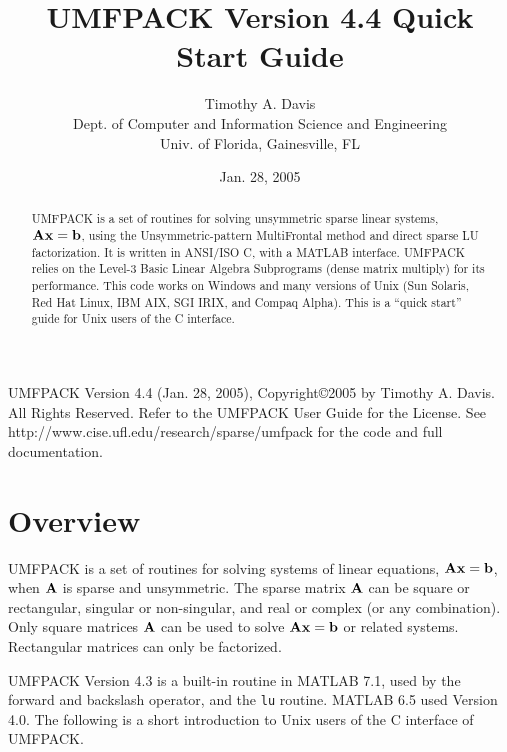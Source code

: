 \documentclass[11pt]{article}
\newcommand{\m}[1]{{\bf{#1}}}       %
\begin{document}
\author{Timothy A. Davis \\
Dept. of Computer and Information Science and Engineering \\
Univ. of Florida, Gainesville, FL}
\title{UMFPACK Version 4.4 Quick Start Guide}
\date{Jan. 28, 2005}
\maketitle

\begin{abstract}
    UMFPACK is a set of routines for solving unsymmetric sparse linear
    systems, $\m{Ax}=\m{b}$, using the Unsymmetric-pattern MultiFrontal method
    and direct sparse LU factorization.  It is written in ANSI/ISO C, with a
    MATLAB interface.  UMFPACK relies on the Level-3
    Basic Linear Algebra Subprograms (dense matrix multiply) for its
    performance.  This code works on Windows and many versions of Unix (Sun
    Solaris, Red Hat Linux, IBM AIX, SGI IRIX, and Compaq Alpha).
    This is a ``quick start'' guide for Unix users of the C interface.
\end{abstract}

UMFPACK Version 4.4 (Jan. 28, 2005), Copyright\copyright 2005 by Timothy A.
Davis.  All Rights Reserved.  Refer to the UMFPACK User Guide
for the License. See \newline
http://www.cise.ufl.edu/research/sparse/umfpack
for the code and full documentation.

\section{Overview}

UMFPACK is a set of routines for solving systems of linear
equations, $\m{Ax}=\m{b}$, when $\m{A}$ is sparse and unsymmetric.
The sparse matrix $\m{A}$ can be square or rectangular, singular
or non-singular, and real or complex (or any combination).  Only square
matrices $\m{A}$ can be used to solve $\m{Ax}=\m{b}$ or related systems.
Rectangular matrices can only be factorized.

UMFPACK Version 4.3 is a built-in routine in MATLAB 7.1, used by the forward and
backslash operator, and the {\tt lu} routine.  MATLAB 6.5 used Version 4.0.
The following is a short
introduction to Unix users of the C interface of UMFPACK.
\end{document}
